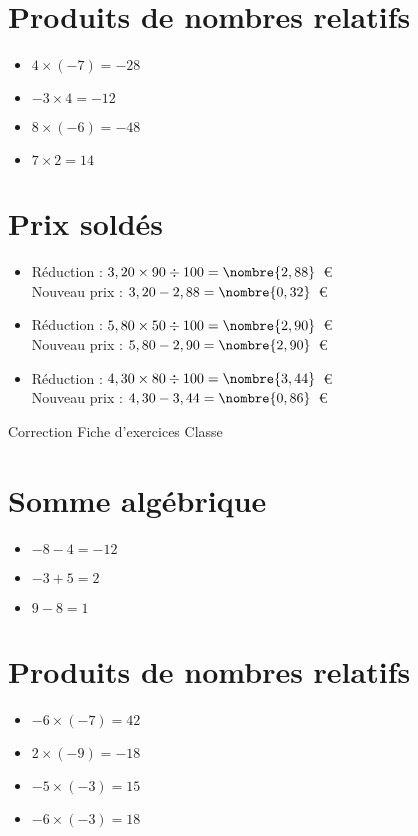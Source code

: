 \documentclass[a4paper,11pt,fleqn]{article}		%
\begin{document}
\section{Produits de nombres relatifs}
\begin{itemize}

  \item $4\times(-7)=-28$
  \item $-3\times4=-12$
  \item $8\times(-6)=-48$
  \item $7\times2=14$
\end{itemize}

\section{Prix soldés}
\begin{itemize}

  \item Réduction : $3,20\times90\div100=\nombre{2,88}$~€\\
  Nouveau prix : $3,20-2,88=\nombre{0,32}$~€
  \item Réduction : $5,80\times50\div100=\nombre{2,90}$~€\\
  Nouveau prix : $5,80-2,90=\nombre{2,90}$~€
  \item Réduction : $4,30\times80\div100=\nombre{3,44}$~€\\
  Nouveau prix : $4,30-3,44=\nombre{0,86}$~€
\end{itemize}
\newpage
\setcounter{exo}{0}
\setcounter{section}{0}
{Correction} \hfill {\huge Fiche d'exercices } \hfill {Classe}

\section{Somme algébrique}
\begin{itemize}

  \item $-8 -4=-12$
  \item $-3 +5=2$
  \item $9 -8=1$
\end{itemize}

\section{Produits de nombres relatifs}
\begin{itemize}

  \item $-6\times(-7)=42$
  \item $2\times(-9)=-18$
  \item $-5\times(-3)=15$
  \item $-6\times(-3)=18$
\end{itemize}
\end{document}
